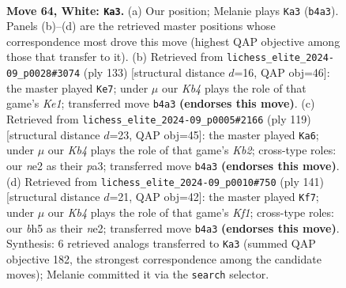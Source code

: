 \documentclass[11pt]{article}
\begin{document}
\clearpage

\begin{figure}[p]\centering
\begin{subfigure}{0.46\textwidth}\centering
\resizebox{\linewidth}{!}{%
\newchessgame
\chessboard[
  setfen={8/7p/4k3/4p2b/1K6/8/4n1r1/1r6 w - - 1 64},
  showmover=false,
  pgfstyle=straightmove, color=movearrow, markmove={b4-a3}
]}
\caption{}
\end{subfigure}\hfill
\begin{subfigure}{0.46\textwidth}\centering
\resizebox{\linewidth}{!}{%
\newchessgame
\chessboard[
  setfen={4k1RN/8/7K/7P/8/8/5r2/8 b - - 2 67},
  showmover=false,
  pgfstyle=straightmove, color=movearrow, markmove={e8-e7}
]}
\caption{}
\end{subfigure}
\\[4pt]
\begin{subfigure}{0.46\textwidth}\centering
\resizebox{\linewidth}{!}{%
\newchessgame
\chessboard[
  setfen={8/1k1R4/8/2K5/2P5/P7/8/6r1 b - - 18 60},
  showmover=false,
  pgfstyle=straightmove, color=movearrow, markmove={b7-a6}
]}
\caption{}
\end{subfigure}\hfill
\begin{subfigure}{0.46\textwidth}\centering
\resizebox{\linewidth}{!}{%
\newchessgame
\chessboard[
  setfen={R4k2/8/8/1r1n4/8/5P2/4NK2/8 b - - 12 71},
  showmover=false,
  pgfstyle=straightmove, color=movearrow, markmove={f8-f7}
]}
\caption{}
\end{subfigure}
\caption{\textbf{Move 64, White: \texttt{Ka3}.} (a) Our position; Melanie plays \texttt{Ka3} (\texttt{b4a3}). Panels (b)--(d) are the retrieved master positions whose correspondence most drove this move (highest QAP objective among those that transfer to it). (b) Retrieved from \texttt{lichess\_elite\_2024-09\_p0028\#3074} (ply 133) [structural distance $d$=16, QAP obj=46]: the master played \texttt{Ke7}; under $\mu$ our \emph{Kb4} plays the role of that game's \emph{Ke1}; transferred move \texttt{b4a3} \textbf{(endorses this move)}. (c) Retrieved from \texttt{lichess\_elite\_2024-09\_p0005\#2166} (ply 119) [structural distance $d$=23, QAP obj=45]: the master played \texttt{Ka6}; under $\mu$ our \emph{Kb4} plays the role of that game's \emph{Kb2}; cross-type roles: our \emph{n}e2 as their \emph{p}a3; transferred move \texttt{b4a3} \textbf{(endorses this move)}. (d) Retrieved from \texttt{lichess\_elite\_2024-09\_p0010\#750} (ply 141) [structural distance $d$=21, QAP obj=42]: the master played \texttt{Kf7}; under $\mu$ our \emph{Kb4} plays the role of that game's \emph{Kf1}; cross-type roles: our \emph{b}h5 as their \emph{n}e2; transferred move \texttt{b4a3} \textbf{(endorses this move)}. Synthesis: 6 retrieved analogs transferred to \texttt{Ka3} (summed QAP objective 182, the strongest correspondence among the candidate moves); Melanie committed it via the \texttt{search} selector.}
\label{fig:thought-m126}
\end{figure}
\end{document}
